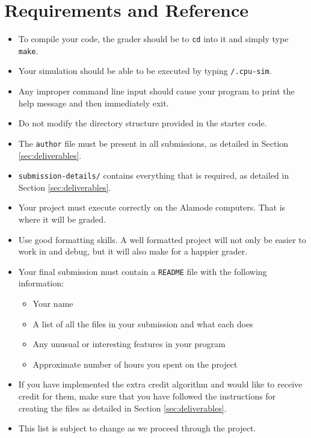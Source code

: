 \documentclass[main.tex]{subfiles}
\begin{document}
\section{Requirements and Reference}
\label{sec:req_refs}

\begin{itemize}
    \item To compile your code, the grader should be to \texttt{cd} into it and simply type \texttt{make}.
    \item Your simulation should be able to be executed by typing \texttt{/.cpu-sim}.
    \item Any improper command line input should cause your program to print the help message and then immediately exit.
    \item Do not modify the directory structure provided in the starter code.
    \item The \texttt{author} file must be present in all submissions, as detailed in Section \ref{sec:deliverables}.
    \item \texttt{submission-details/} contains everything that is required, as detailed in Section \ref{sec:deliverables}.
    \item Your project must execute correctly on the Alamode computers. That is where it will be graded.
    \item Use good formatting skills. A well formatted project will not only be easier to work in and debug, but it will also make for a happier grader.
    \item Your final submission must contain a \texttt{README} file with the following information:
    \begin{itemize}
        \item Your name
        \item A list of all the files in your submission and what each does
        \item Any unusual or interesting features in your program
        \item Approximate number of hours you spent on the project
    \end{itemize}
    \item If you have implemented the extra credit algorithm and would like to receive credit for them, make sure that you have followed the instructions for creating the files as detailed in Section \ref{sec:deliverables}.
    \item This list is subject to change as we proceed through the project.
\end{itemize}
\end{document}

